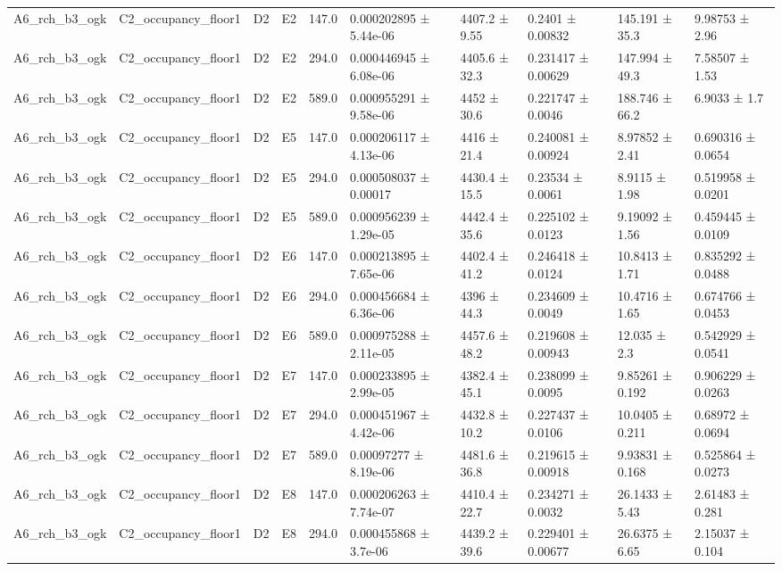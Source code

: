 \begin{table}
\begin{tabular}{llllllllll}
A6\_rch\_b3\_ogk & C2\_occupancy\_floor1 & D2 & E2 & 147.0 & 0.000202895 ± 5.44e-06 & 4407.2 ± 9.55 & 0.2401 ± 0.00832 & 145.191 ± 35.3 & 9.98753 ± 2.96 \\
A6\_rch\_b3\_ogk & C2\_occupancy\_floor1 & D2 & E2 & 294.0 & 0.000446945 ± 6.08e-06 & 4405.6 ± 32.3 & 0.231417 ± 0.00629 & 147.994 ± 49.3 & 7.58507 ± 1.53 \\
A6\_rch\_b3\_ogk & C2\_occupancy\_floor1 & D2 & E2 & 589.0 & 0.000955291 ± 9.58e-06 & 4452 ± 30.6 & 0.221747 ± 0.0046 & 188.746 ± 66.2 & 6.9033 ± 1.7 \\
A6\_rch\_b3\_ogk & C2\_occupancy\_floor1 & D2 & E5 & 147.0 & 0.000206117 ± 4.13e-06 & 4416 ± 21.4 & 0.240081 ± 0.00924 & 8.97852 ± 2.41 & 0.690316 ± 0.0654 \\
A6\_rch\_b3\_ogk & C2\_occupancy\_floor1 & D2 & E5 & 294.0 & 0.000508037 ± 0.00017 & 4430.4 ± 15.5 & 0.23534 ± 0.0061 & 8.9115 ± 1.98 & 0.519958 ± 0.0201 \\
A6\_rch\_b3\_ogk & C2\_occupancy\_floor1 & D2 & E5 & 589.0 & 0.000956239 ± 1.29e-05 & 4442.4 ± 35.6 & 0.225102 ± 0.0123 & 9.19092 ± 1.56 & 0.459445 ± 0.0109 \\
A6\_rch\_b3\_ogk & C2\_occupancy\_floor1 & D2 & E6 & 147.0 & 0.000213895 ± 7.65e-06 & 4402.4 ± 41.2 & 0.246418 ± 0.0124 & 10.8413 ± 1.71 & 0.835292 ± 0.0488 \\
A6\_rch\_b3\_ogk & C2\_occupancy\_floor1 & D2 & E6 & 294.0 & 0.000456684 ± 6.36e-06 & 4396 ± 44.3 & 0.234609 ± 0.0049 & 10.4716 ± 1.65 & 0.674766 ± 0.0453 \\
A6\_rch\_b3\_ogk & C2\_occupancy\_floor1 & D2 & E6 & 589.0 & 0.000975288 ± 2.11e-05 & 4457.6 ± 48.2 & 0.219608 ± 0.00943 & 12.035 ± 2.3 & 0.542929 ± 0.0541 \\
A6\_rch\_b3\_ogk & C2\_occupancy\_floor1 & D2 & E7 & 147.0 & 0.000233895 ± 2.99e-05 & 4382.4 ± 45.1 & 0.238099 ± 0.0095 & 9.85261 ± 0.192 & 0.906229 ± 0.0263 \\
A6\_rch\_b3\_ogk & C2\_occupancy\_floor1 & D2 & E7 & 294.0 & 0.000451967 ± 4.42e-06 & 4432.8 ± 10.2 & 0.227437 ± 0.0106 & 10.0405 ± 0.211 & 0.68972 ± 0.0694 \\
A6\_rch\_b3\_ogk & C2\_occupancy\_floor1 & D2 & E7 & 589.0 & 0.00097277 ± 8.19e-06 & 4481.6 ± 36.8 & 0.219615 ± 0.00918 & 9.93831 ± 0.168 & 0.525864 ± 0.0273 \\
A6\_rch\_b3\_ogk & C2\_occupancy\_floor1 & D2 & E8 & 147.0 & 0.000206263 ± 7.74e-07 & 4410.4 ± 22.7 & 0.234271 ± 0.0032 & 26.1433 ± 5.43 & 2.61483 ± 0.281 \\
A6\_rch\_b3\_ogk & C2\_occupancy\_floor1 & D2 & E8 & 294.0 & 0.000455868 ± 3.7e-06 & 4439.2 ± 39.6 & 0.229401 ± 0.00677 & 26.6375 ± 6.65 & 2.15037 ± 0.104 \\

\end{tabular}
\end{table}
